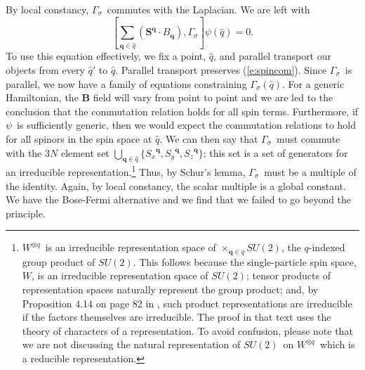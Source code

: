 \documentclass[11pt]{article}
\theoremstyle{remark}
\begin{document}
By local constancy, \ensuremath{\Gamma_{\ensuremath{\sigma}}}\ commutes with the
Laplacian.
We are left with 
\begin{equation} \label{e:spincom}
[\sum_{\ensuremath{\boldsymbol{q}} \in \ensuremath{\hat{q}}} \ensuremath{(\ensuremath{\boldsymbol{S}}^{\ensuremath{\boldsymbol{q}}} \cdot
{B}_{{\ensuremath{\boldsymbol{q}}}})}, \ensuremath{\Gamma_{\ensuremath{\sigma}}}] \ensuremath{\psi} (\ensuremath{\hat{q}}) = 0.
\end{equation}
To use this equation effectively, we fix a point, $\ensuremath{\hat{q}}$, and
parallel transport our objects from every $\ensuremath{\hat{q}}'$ to \ensuremath{\hat{q}}. Parallel
transport preserves (\ref{e:spincom}). Since \ensuremath{\Gamma_{\ensuremath{\sigma}}}\ is parallel,
we now have a family of equations constraining $\ensuremath{\Gamma_{\ensuremath{\sigma}}}(\ensuremath{\hat{q}})$. For a generic
Hamiltonian, the $\boldsymbol{B}$ field will vary from point to point and we
are led to the conclusion that the commutation relation holds for all
spin terms. Furthermore, if \ensuremath{\psi}\ is sufficiently generic, then we
would expect the commutation relations to hold for all spinors in the
spin space at \ensuremath{\hat{q}}. We can then say that \ensuremath{\Gamma_{\ensuremath{\sigma}}}\ must commute with 
the $3N$ 
element set $\bigcup_{ \ensuremath{\boldsymbol{q}} \in \ensuremath{\hat{q}}
} \{\ensuremath{{S_{x}}}^{\ensuremath{\boldsymbol{q}}}, \ensuremath{{S_{y}}}^{\ensuremath{\boldsymbol{q}}}, \ensuremath{{S_{z}}}^{\ensuremath{\boldsymbol{q}}}\}$;
this set is a set of generators for an irreducible
representation.\footnote{
\ensuremath{{\ensuremath{W}}^{{\otimes}{\ensuremath{q}}}}\ is an irreducible representation space of \ensuremath{\mathop{\times}_{\ensuremath{\boldsymbol{q}} \in \ensuremath{q}} \ensuremath{SU(2)}}, the 
\ensuremath{q}-indexed group product of \ensuremath{SU(2)}. This follows because 
the single-particle
spin space, \ensuremath{W}, is an irreducible representation space of
\ensuremath{SU(2)}; tensor products of representation spaces naturally represent
the group product; and, by Proposition 4.14 on page 82 in \cite{BrDi},
such product representations are irreducible if the factors themselves are
irreducible. The proof in that text uses the theory of
characters of a representation. 
To avoid confusion, please note that we are not discussing the
natural representation of \ensuremath{SU(2)}\ on 
\ensuremath{{\ensuremath{W}}^{{\otimes}{\ensuremath{q}}}}\ which is a reducible representation. 
}
Thus, by
Schur's lemma, \ensuremath{\Gamma_{\ensuremath{\sigma}}}\ must be a multiple of the identity. Again, by
local constancy, 
 the scalar
multiple is a global constant.  We have the Bose-Fermi
alternative and we find that we failed to 
 go beyond the principle. 
\end{document}

